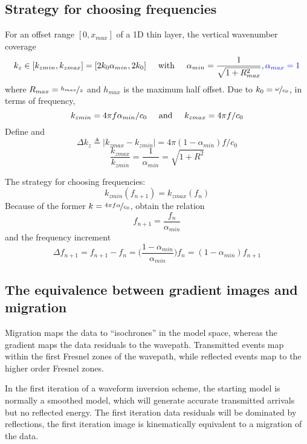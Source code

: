 \subsection{Strategy for choosing frequencies}
For an offset range $[0,x_{max}]$ of a 1D thin layer, the vertical wavenumber coverage
\[ k_z\in[k_{zmin},k_{zmax}]=[2k_0\alpha_{min},2k_0] \text{\hspace{5mm}with\hspace{5mm}} \alpha_{min}=\frac{1}{\sqrt{1+R_{max}^2}}{\color{blue},\alpha_{max}=1} \]
where $R_{max}=\nicefrac{h_{max}}{z}$ and $h_{max}$ is the maximum half offset. Due to $k_0=\nicefrac{\omega}{c_0}$, in terms of frequency,
\[ k_{zmin}=4\pi f\alpha_{min}/c_0 \text{\hspace{5mm}and\hspace{5mm}} k_{zmax}=4\pi f/c_0 \]
Define  and 
\[ \Delta k_z\triangleq|k_{zmax}-k_{zmin}|=4\pi(1-\alpha_{min})f/c_0 \]
\[ \frac{k_{zmax}}{k_{zmin}}=\frac{1}{\alpha_{min}}=\sqrt{1+R^2} \]\par
The strategy for choosing frequencies:
\[ k_{zmin}(f_{n+1})=k_{zmax}(f_n) \]
Because of the former $k=\nicefrac{4\pi f\alpha}{c_0}$, obtain the relation
\[ f_{n+1}=\frac{f_n}{\alpha_{min}} \]
and the frequency increment
\[ \Delta f_{n+1}=f_{n+1}-f_n=\Big(\frac{1-\alpha_{min}}{\alpha_{min}}\Big)f_n=(1-\alpha_{min})f_{n+1} \]\par
\subsection{The equivalence between gradient images and migration}
Migration maps the data to ``isochrones'' in the model space, whereas the gradient maps the data residuals to the wavepath. Transmitted events map within the first Fresnel zones of the wavepath, while reflected events map to the higher order Fresnel zones.\par
In the first iteration of a waveform inversion scheme, the starting model is normally a smoothed model, which will generate accurate transmitted arrivals but no reflected energy. The first iteration data residuals will be dominated by reflections, the first iteration image is kinematically equivalent to a migration of the data.\par
